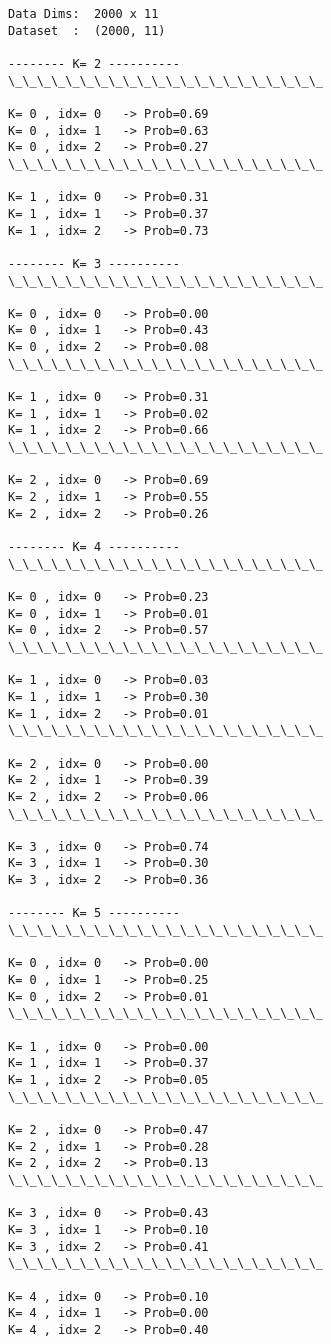 \documentclass[11pt]{article}
\begin{document}
    \begin{Verbatim}[commandchars=\\\{\}]
Data Dims:  2000 x 11
Dataset  :  (2000, 11)

-------- K= 2 ----------
\_\_\_\_\_\_\_\_\_\_\_\_\_\_\_\_\_\_\_\_\_\_ 

K= 0 , idx= 0   -> Prob=0.69
K= 0 , idx= 1   -> Prob=0.63
K= 0 , idx= 2   -> Prob=0.27
\_\_\_\_\_\_\_\_\_\_\_\_\_\_\_\_\_\_\_\_\_\_ 

K= 1 , idx= 0   -> Prob=0.31
K= 1 , idx= 1   -> Prob=0.37
K= 1 , idx= 2   -> Prob=0.73

-------- K= 3 ----------
\_\_\_\_\_\_\_\_\_\_\_\_\_\_\_\_\_\_\_\_\_\_ 

K= 0 , idx= 0   -> Prob=0.00
K= 0 , idx= 1   -> Prob=0.43
K= 0 , idx= 2   -> Prob=0.08
\_\_\_\_\_\_\_\_\_\_\_\_\_\_\_\_\_\_\_\_\_\_ 

K= 1 , idx= 0   -> Prob=0.31
K= 1 , idx= 1   -> Prob=0.02
K= 1 , idx= 2   -> Prob=0.66
\_\_\_\_\_\_\_\_\_\_\_\_\_\_\_\_\_\_\_\_\_\_ 

K= 2 , idx= 0   -> Prob=0.69
K= 2 , idx= 1   -> Prob=0.55
K= 2 , idx= 2   -> Prob=0.26

-------- K= 4 ----------
\_\_\_\_\_\_\_\_\_\_\_\_\_\_\_\_\_\_\_\_\_\_ 

K= 0 , idx= 0   -> Prob=0.23
K= 0 , idx= 1   -> Prob=0.01
K= 0 , idx= 2   -> Prob=0.57
\_\_\_\_\_\_\_\_\_\_\_\_\_\_\_\_\_\_\_\_\_\_ 

K= 1 , idx= 0   -> Prob=0.03
K= 1 , idx= 1   -> Prob=0.30
K= 1 , idx= 2   -> Prob=0.01
\_\_\_\_\_\_\_\_\_\_\_\_\_\_\_\_\_\_\_\_\_\_ 

K= 2 , idx= 0   -> Prob=0.00
K= 2 , idx= 1   -> Prob=0.39
K= 2 , idx= 2   -> Prob=0.06
\_\_\_\_\_\_\_\_\_\_\_\_\_\_\_\_\_\_\_\_\_\_ 

K= 3 , idx= 0   -> Prob=0.74
K= 3 , idx= 1   -> Prob=0.30
K= 3 , idx= 2   -> Prob=0.36

-------- K= 5 ----------
\_\_\_\_\_\_\_\_\_\_\_\_\_\_\_\_\_\_\_\_\_\_ 

K= 0 , idx= 0   -> Prob=0.00
K= 0 , idx= 1   -> Prob=0.25
K= 0 , idx= 2   -> Prob=0.01
\_\_\_\_\_\_\_\_\_\_\_\_\_\_\_\_\_\_\_\_\_\_ 

K= 1 , idx= 0   -> Prob=0.00
K= 1 , idx= 1   -> Prob=0.37
K= 1 , idx= 2   -> Prob=0.05
\_\_\_\_\_\_\_\_\_\_\_\_\_\_\_\_\_\_\_\_\_\_ 

K= 2 , idx= 0   -> Prob=0.47
K= 2 , idx= 1   -> Prob=0.28
K= 2 , idx= 2   -> Prob=0.13
\_\_\_\_\_\_\_\_\_\_\_\_\_\_\_\_\_\_\_\_\_\_ 

K= 3 , idx= 0   -> Prob=0.43
K= 3 , idx= 1   -> Prob=0.10
K= 3 , idx= 2   -> Prob=0.41
\_\_\_\_\_\_\_\_\_\_\_\_\_\_\_\_\_\_\_\_\_\_ 

K= 4 , idx= 0   -> Prob=0.10
K= 4 , idx= 1   -> Prob=0.00
K= 4 , idx= 2   -> Prob=0.40

    \end{Verbatim}
\end{document}
